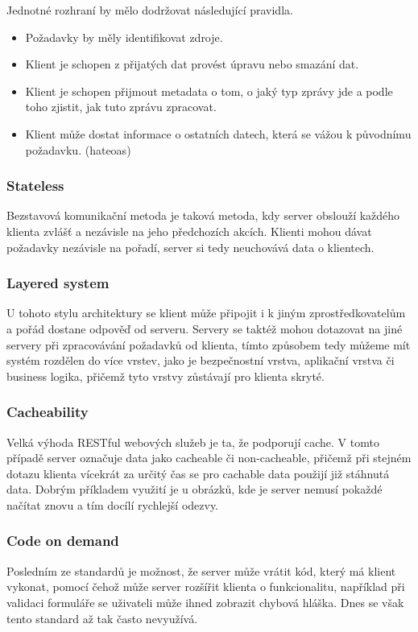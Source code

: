 Jednotné rozhraní by mělo dodržovat následující pravidla.\
\begin{itemize}
    \item Požadavky by měly identifikovat zdroje.
    \item Klient je schopen z přijatých dat provést úpravu nebo smazání dat.
    \item Klient je schopen přijmout metadata o tom, o jaký typ zprávy jde a podle toho zjistit, jak tuto zprávu zpracovat.
    \item Klient může dostat informace o ostatních datech, která se vážou k původnímu požadavku. (\gls{hateoas})
\end{itemize}

\subsubsection*{Stateless}
Bezstavová komunikační metoda je taková metoda, kdy server obslouží každého klienta zvlášť a nezávisle na jeho předchozích akcích. Klienti mohou dávat požadavky nezávisle na pořadí, server si tedy neuchovává data o klientech.

\subsubsection*{Layered system}
U tohoto stylu architektury se klient může připojit i k jiným zprostředkovatelům a pořád dostane odpověď od serveru. Servery se taktéž mohou dotazovat na jiné servery při zpracovávání požadavků od klienta, tímto způsobem tedy můžeme mít systém rozdělen do více vrstev, jako je bezpečnostní vrstva, aplikační vrstva či business logika, přičemž tyto vrstvy zůstávají pro klienta skryté.

\subsubsection*{Cacheability}
Velká výhoda RESTful webových služeb je ta, že podporují cache. V tomto případě server označuje data jako cacheable či non-cacheable, přičemž při stejném dotazu klienta vícekrát za určitý čas se pro cachable data použijí již stáhnutá data. Dobrým příkladem využití je u obrázků, kde je server nemusí pokaždé načítat znovu a tím docílí rychlejší odezvy.

\subsubsection*{Code on demand}
Posledním ze standardů je možnost, že server může vrátit kód, který má klient vykonat, pomocí čehož může server rozšířit klienta o funkcionalitu, například při validaci formuláře se uživateli může ihned zobrazit chybová hláška. Dnes se však tento standard až tak často nevyužívá.


